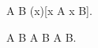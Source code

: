 A \subseteq B \triangleq (\forall x)[x \in A \rightarrow x \in B].

A \subset B \triangleq A \subseteq B \wedge A \neq B.
